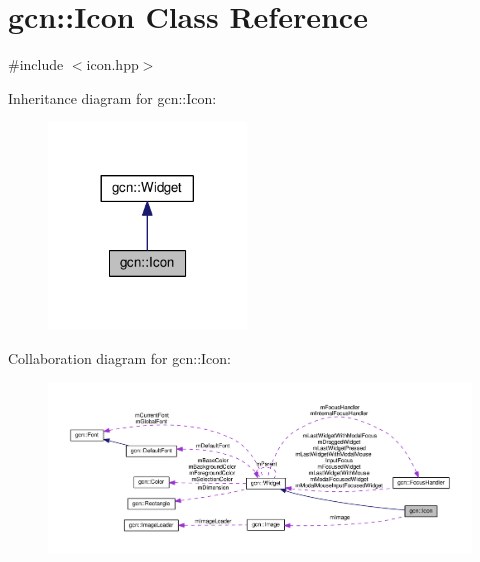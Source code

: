 \hypertarget{classgcn_1_1Icon}{}\section{gcn\+:\+:Icon Class Reference}
\label{classgcn_1_1Icon}


{\ttfamily \#include $<$icon.\+hpp$>$}



Inheritance diagram for gcn\+:\+:Icon\+:\nopagebreak
\begin{figure}[H]
\begin{center}
\leavevmode
\includegraphics[width=149pt]{classgcn_1_1Icon__inherit__graph}
\end{center}
\end{figure}


Collaboration diagram for gcn\+:\+:Icon\+:\nopagebreak
\begin{figure}[H]
\begin{center}
\leavevmode
\includegraphics[width=350pt]{classgcn_1_1Icon__coll__graph}
\end{center}
\end{figure}
